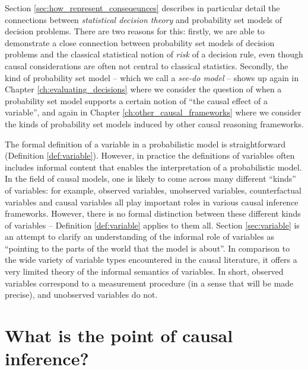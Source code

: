 Section \ref{sec:how_represent_conseqeunces} describes in particular detail the connections between \emph{statistical decision theory} \citep{wald_statistical_1950} and probability set models of decision problems. There are two reasons for this: firstly, we are able to demonstrate a close connection between probability set models of decision problems and the classical statistical notion of \emph{risk} of a decision rule, even though causal considerations are often not central to classical statistics. Secondly, the kind of probability set model -- which we call a \emph{see-do model} -- shows up again in Chapter \ref{ch:evaluating_decisions} where we consider the question of when a probability set model supports a certain notion of ``the causal effect of a variable'', and again in Chapter \ref{ch:other_causal_frameworks} where we consider the kinds of probability set models induced by other causal reasoning frameworks.

The formal definition of a variable in a probabilistic model is straightforward (Definition \ref{def:variable}). However, in practice the definitions of variables often includes informal content that enables the interpretation of a probabilistic model. In the field of causal models, one is likely to come across many different ``kinds'' of variables: for example, observed variables, unobserved variables, counterfactual variables and causal variables all play important roles in various causal inference frameworks. However, there is no formal distinction between these different kinds of variables -- Definition \ref{def:variable} applies to them all. Section \ref{sec:variable} is an attempt to clarify an understanding of the informal role of variables as ``pointing to the parts of the world that the model is about''. In comparison to the wide variety of variable types encountered in the causal literature, it offers a very limited theory of the informal semantics of variables. In short, observed variables correspond to a measurement procedure (in a sense that will be made precise), and unobserved variables do not.

\section{What is the point of causal inference?}\label{sec:whats_the_point}

